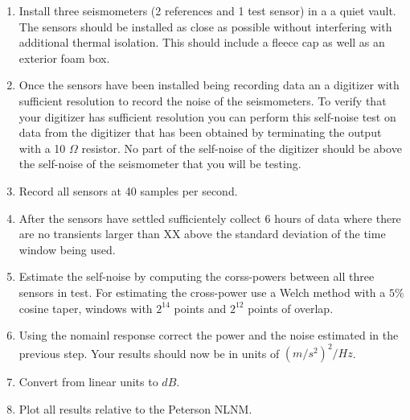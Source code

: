 \documentclass[12pt]{amsart}
\begin{document}
\begin{enumerate}

    \item Install three seismometers (2 references and 1 test sensor) in a a quiet vault.  The sensors should be installed as close as
    possible without interfering with additional thermal isolation.  This should include a fleece cap as well as an exterior foam box.
    
    \item Once the sensors have been installed being recording data an a digitizer with sufficient resolution to record the noise of the seismometers.
    To verify that your digitizer has sufficient resolution you can perform this self-noise test on data from the digitizer that has been obtained by 
    terminating the output with a 10 $\Omega$ resistor.  No part of the self-noise of the digitizer should be above the self-noise of the seismometer that you 
    will be testing.
    
    \item Record all sensors at 40 samples per second.  
    
    \item After the sensors have settled sufficientely collect 6 hours of data where there are no transients larger than XX above the standard deviation
    of the time window being used.
    
    \item Estimate the self-noise by computing the corss-powers between all three sensors in test.  For estimating the cross-power use a Welch method
    with a $5\%$ cosine taper, windows with $2^14$ points and $2^12$ points of overlap.  
    
    \item Using the nomainl response correct the power and the noise estimated in the previous step.  Your results should now be in units of $(m/s^2)^2 /Hz$.
    
    \item Convert from linear units to $dB$.
    
    \item Plot all results relative to the Peterson NLNM.
    
\end{enumerate}
\end{document}

